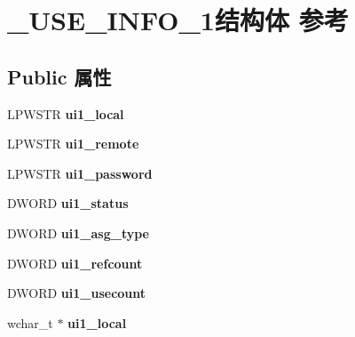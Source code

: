 \hypertarget{struct___u_s_e___i_n_f_o__1}{}\section{\+\_\+\+U\+S\+E\+\_\+\+I\+N\+F\+O\+\_\+1结构体 参考}
\label{struct___u_s_e___i_n_f_o__1}
\subsection*{Public 属性}
\begin{DoxyCompactItemize}
\item 
\mbox{\label{struct___u_s_e___i_n_f_o__1_aed6fc8cf8c8e2b0fa125d31cebb9daff}} 
L\+P\+W\+S\+TR {\bfseries ui1\+\_\+local}
\item 
\mbox{\label{struct___u_s_e___i_n_f_o__1_a32743e7a676199c1d1e753c97c8256e8}} 
L\+P\+W\+S\+TR {\bfseries ui1\+\_\+remote}
\item 
\mbox{\label{struct___u_s_e___i_n_f_o__1_a82d008100f317d707e191b28175f449f}} 
L\+P\+W\+S\+TR {\bfseries ui1\+\_\+password}
\item 
\mbox{\label{struct___u_s_e___i_n_f_o__1_ad97905485c4d2d1f5ff87c929ee87817}} 
D\+W\+O\+RD {\bfseries ui1\+\_\+status}
\item 
\mbox{\label{struct___u_s_e___i_n_f_o__1_a702999cb2b4b1e996c016e2fd4037201}} 
D\+W\+O\+RD {\bfseries ui1\+\_\+asg\+\_\+type}
\item 
\mbox{\label{struct___u_s_e___i_n_f_o__1_a5067a6816e5bdac50e37878006aab25a}} 
D\+W\+O\+RD {\bfseries ui1\+\_\+refcount}
\item 
\mbox{\label{struct___u_s_e___i_n_f_o__1_aab37bb970fe400101a5490102efe71f1}} 
D\+W\+O\+RD {\bfseries ui1\+\_\+usecount}
\item 
\mbox{\label{struct___u_s_e___i_n_f_o__1_aafb13e91be2c5d5ec7fb43bff0c1d2e4}} 
wchar\+\_\+t $\ast$ {\bfseries ui1\+\_\+local}
\item 

\end{DoxyCompactItemize}
